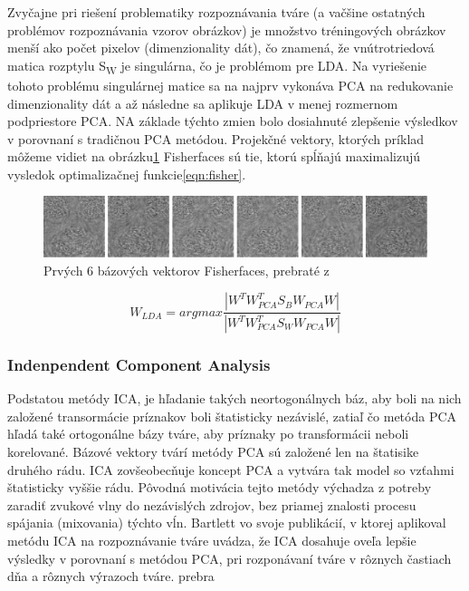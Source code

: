 Zvyčajne pri riešení problematiky rozpoznávania tváre (a vačšine ostatných problémov rozpoznávania vzorov obrázkov) je množstvo tréningových obrázkov menší ako počet pixelov
(dimenzionality dát), čo znamená, že vnútrotriedová matica rozptylu S\textsubscript{W} je singulárna, čo je problémom pre LDA.
Na vyriešenie tohoto problému singulárnej matice sa na najprv vykonáva PCA na redukovanie dimenzionality dát a
až následne sa aplikuje LDA v menej rozmernom podpriestore PCA.
NA základe týchto zmien bolo dosiahnuté zlepšenie výsledkov v porovnaní s tradičnou PCA metódou.
Projekčné vektory, ktorých príklad môžeme vidiet na obrázku\ref{fig:fisherfaces}  Fisherfaces sú tie, ktorú spĺňajú maximalizujú vysledok optimalizačnej funkcie\eqref{eqn:fisher}.

\begin{figure}[H]
	\centering
	\includegraphics[width=1\linewidth]{img/fisherfaces.png}
	\caption{Prvých 6 bázových vektorov Fisherfaces, prebraté z\cite[s.~46]{handbookbio}}
	\label{fig:fisherfaces}
\end{figure}

\begin{equation}\label{eqn:fisher}
	W_{LDA} = arg max \frac{|W^T W_{PCA}^T S_B W_{PCA} W|}{|W^T W_{PCA}^T S_W W_{PCA} W|}
\end{equation}

\subsubsection{Indenpendent Component Analysis}
Podstatou metódy ICA, je hľadanie takých neortogonálnych báz,
aby boli na nich založené transormácie príznakov boli štatisticky nezávislé, zatiaľ čo
metóda PCA hľadá také ortogonálne bázy tváre, aby príznaky po transformácii neboli korelované\cite{handbookbio}.
Bázové vektory tvárí metódy PCA sú založené len na štatisike druhého rádu.
ICA zovšeobecňuje koncept PCA a vytvára tak model so vzťahmi štatisticky vyššie rádu.
Pôvodná motivácia tejto metódy výchadza z potreby zaradiť zvukové vlny do nezávislých zdrojov, bez priamej znalosti procesu spájania
(mixovania) týchto vĺn\cite{handbookbio}. Bartlett vo svoje publikácií\cite{bartlett2002face}, v ktorej aplikoval metódu ICA
na rozpoznávanie tváre uvádza, že ICA dosahuje oveľa lepšie výsledky v porovnaní s metódou PCA, pri rozponávaní tváre v rôznych častiach dňa a rôznych výrazoch tváre.
prebra
